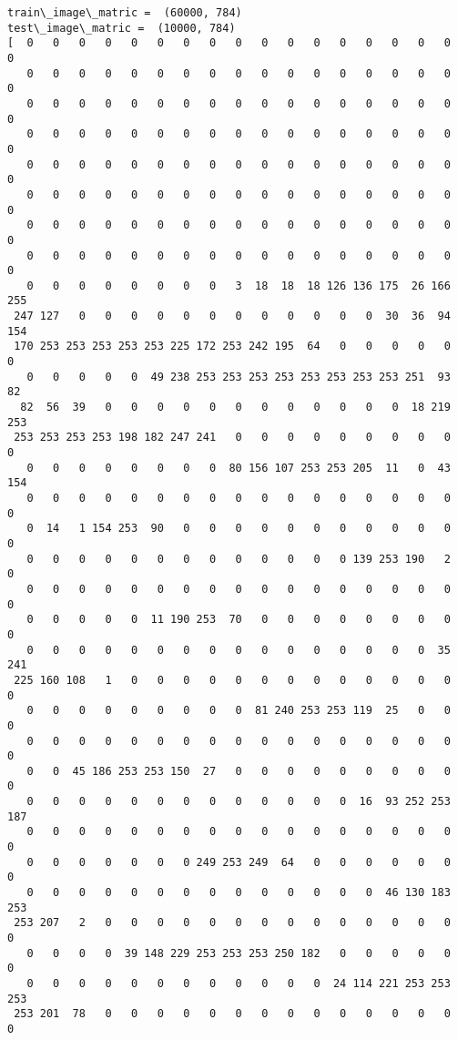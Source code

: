 \documentclass[11pt]{article}
\begin{document}
    \begin{Verbatim}[commandchars=\\\{\}]
train\_image\_matric =  (60000, 784)
test\_image\_matric =  (10000, 784)
[  0   0   0   0   0   0   0   0   0   0   0   0   0   0   0   0   0   0
   0   0   0   0   0   0   0   0   0   0   0   0   0   0   0   0   0   0
   0   0   0   0   0   0   0   0   0   0   0   0   0   0   0   0   0   0
   0   0   0   0   0   0   0   0   0   0   0   0   0   0   0   0   0   0
   0   0   0   0   0   0   0   0   0   0   0   0   0   0   0   0   0   0
   0   0   0   0   0   0   0   0   0   0   0   0   0   0   0   0   0   0
   0   0   0   0   0   0   0   0   0   0   0   0   0   0   0   0   0   0
   0   0   0   0   0   0   0   0   0   0   0   0   0   0   0   0   0   0
   0   0   0   0   0   0   0   0   3  18  18  18 126 136 175  26 166 255
 247 127   0   0   0   0   0   0   0   0   0   0   0   0  30  36  94 154
 170 253 253 253 253 253 225 172 253 242 195  64   0   0   0   0   0   0
   0   0   0   0   0  49 238 253 253 253 253 253 253 253 253 251  93  82
  82  56  39   0   0   0   0   0   0   0   0   0   0   0   0  18 219 253
 253 253 253 253 198 182 247 241   0   0   0   0   0   0   0   0   0   0
   0   0   0   0   0   0   0   0  80 156 107 253 253 205  11   0  43 154
   0   0   0   0   0   0   0   0   0   0   0   0   0   0   0   0   0   0
   0  14   1 154 253  90   0   0   0   0   0   0   0   0   0   0   0   0
   0   0   0   0   0   0   0   0   0   0   0   0   0 139 253 190   2   0
   0   0   0   0   0   0   0   0   0   0   0   0   0   0   0   0   0   0
   0   0   0   0   0  11 190 253  70   0   0   0   0   0   0   0   0   0
   0   0   0   0   0   0   0   0   0   0   0   0   0   0   0   0  35 241
 225 160 108   1   0   0   0   0   0   0   0   0   0   0   0   0   0   0
   0   0   0   0   0   0   0   0   0  81 240 253 253 119  25   0   0   0
   0   0   0   0   0   0   0   0   0   0   0   0   0   0   0   0   0   0
   0   0  45 186 253 253 150  27   0   0   0   0   0   0   0   0   0   0
   0   0   0   0   0   0   0   0   0   0   0   0   0  16  93 252 253 187
   0   0   0   0   0   0   0   0   0   0   0   0   0   0   0   0   0   0
   0   0   0   0   0   0   0 249 253 249  64   0   0   0   0   0   0   0
   0   0   0   0   0   0   0   0   0   0   0   0   0   0  46 130 183 253
 253 207   2   0   0   0   0   0   0   0   0   0   0   0   0   0   0   0
   0   0   0   0  39 148 229 253 253 253 250 182   0   0   0   0   0   0
   0   0   0   0   0   0   0   0   0   0   0   0  24 114 221 253 253 253
 253 201  78   0   0   0   0   0   0   0   0   0   0   0   0   0   0   0

\end{Verbatim}
\end{document}
